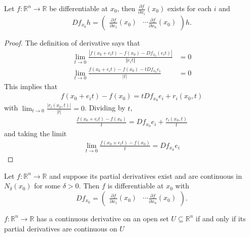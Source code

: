 \documentclass[compress]{beamer}
\def\R{\mathbb{R}}
\newcommand{\norm}[1]{\left\Vert {#1} \right\Vert}
\renewcommand{\to}{{\rightarrow}}
\begin{document}
\begin{frame}
  \begin{theorem}\label{thm:tdiff}
    Let $f: \R^n \to \R$ be differentiable at $x_0$, then
    $\frac{\partial f}{\partial x_i}(x_0)$ exists for each $i$ and 
    \[ Df_{x_0} h = 
    \begin{pmatrix} 
      \frac{ \partial f}{\partial x_1}(x_0) &
      \cdots \frac{ \partial f}{\partial x_n }(x_0)
    \end{pmatrix} h. \]
  \end{theorem}
\end{frame}

\begin{frame}[shrink]
  \begin{proof}
    The definition of derivative says that
    \begin{align*}
      \lim_{t \to 0} \frac{\left|f(x_0 + e_i t) - f(x_0) - Df_{x_0} (e_i t)\right|}
      {\norm{e_i t} } & = 0 \\
      \lim_{t \to 0} \frac{f(x_0 + e_i t) - f(x_0) - t D f_{x_0} e_i}
      {|t| } & =  0
    \end{align*}
    This implies that
    \begin{align*}
      f(x_0 + e_i t) - f(x_0) = t D f_{x_0} e_i + r_i(x_0,t)
    \end{align*}
    with $\lim_{t \to 0} \frac{|r_i(x_0,t)|}{|t|} = 0$. Dividing by $t$, 
    \begin{align*}
      \frac{f(x_0 + e_i t) - f(x_0)}{t} = D f_{x_0} e_i + \frac{r_i(x_0,t)}{t}
    \end{align*}
    and taking the limit
    \begin{align*}
      \lim_{t \to 0} \frac{f(x_0 + e_i t) - f(x_0)}{t} = D f_{x_0} e_i 
    \end{align*}
  \end{proof}
\end{frame}

\begin{frame}
  \begin{theorem}\label{thm:ptdiff}
    Let $f:\R^n \to \R$ and suppose its partial derivatives exist and
    are continuous in $N_\delta(x_0)$ for some $\delta>0$. Then $f$
    is differentiable at $x_0$ with 
    \[ 
    Df_{x_0}= 
    \begin{pmatrix} 
      \frac{ \partial f}{\partial x_1}(x_0) &
      \cdots \frac{ \partial f}{\partial x_n }(x_0)
    \end{pmatrix}. 
    \]
  \end{theorem}
  
  \begin{corollary}
    $f:\R^n \to \R$ has a continuous derivative on an open set $U
    \subseteq \R^n$ if and only if its partial derivatives are
    continuous on $U$
  \end{corollary}  
\end{frame}
\end{document}
